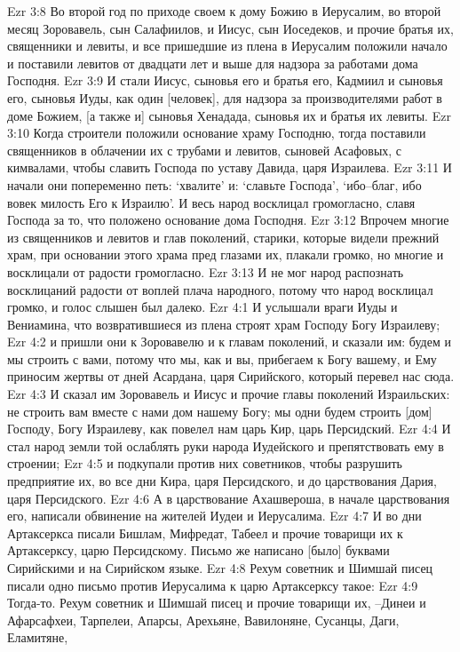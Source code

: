 Ezr 3:8  Во второй год по приходе своем к дому Божию в Иерусалим, во второй месяц Зоровавель, сын Салафиилов, и Иисус, сын Иоседеков, и прочие братья их, священники и левиты, и все пришедшие из плена в Иерусалим положили начало и поставили левитов от двадцати лет и выше для надзора за работами дома Господня.
Ezr 3:9  И стали Иисус, сыновья его и братья его, Кадмиил и сыновья его, сыновья Иуды, как один [человек], для надзора за производителями работ в доме Божием, [а также и] сыновья Хенадада, сыновья их и братья их левиты.
Ezr 3:10  Когда строители положили основание храму Господню, тогда поставили священников в облачении их с трубами и левитов, сыновей Асафовых, с кимвалами, чтобы славить Господа по уставу Давида, царя Израилева.
Ezr 3:11  И начали они попеременно петь: `хвалите' и: `славьте Господа', `ибо--благ, ибо вовек милость Его к Израилю'. И весь народ восклицал громогласно, славя Господа за то, что положено основание дома Господня.
Ezr 3:12  Впрочем многие из священников и левитов и глав поколений, старики, которые видели прежний храм, при основании этого храма пред глазами их, плакали громко, но многие и восклицали от радости громогласно.
Ezr 3:13  И не мог народ распознать восклицаний радости от воплей плача народного, потому что народ восклицал громко, и голос слышен был далеко.
Ezr 4:1  И услышали враги Иуды и Вениамина, что возвратившиеся из плена строят храм Господу Богу Израилеву;
Ezr 4:2  и пришли они к Зоровавелю и к главам поколений, и сказали им: будем и мы строить с вами, потому что мы, как и вы, прибегаем к Богу вашему, и Ему приносим жертвы от дней Асардана, царя Сирийского, который перевел нас сюда.
Ezr 4:3  И сказал им Зоровавель и Иисус и прочие главы поколений Израильских: не строить вам вместе с нами дом нашему Богу; мы одни будем строить [дом] Господу, Богу Израилеву, как повелел нам царь Кир, царь Персидский.
Ezr 4:4  И стал народ земли той ослаблять руки народа Иудейского и препятствовать ему в строении;
Ezr 4:5  и подкупали против них советников, чтобы разрушить предприятие их, во все дни Кира, царя Персидского, и до царствования Дария, царя Персидского.
Ezr 4:6  А в царствование Ахашвероша, в начале царствования его, написали обвинение на жителей Иудеи и Иерусалима.
Ezr 4:7  И во дни Артаксеркса писали Бишлам, Мифредат, Табеел и прочие товарищи их к Артаксерксу, царю Персидскому. Письмо же написано [было] буквами Сирийскими и на Сирийском языке.
Ezr 4:8  Рехум советник и Шимшай писец писали одно письмо против Иерусалима к царю Артаксерксу такое:
Ezr 4:9  Тогда-то. Рехум советник и Шимшай писец и прочие товарищи их, --Динеи и Афарсафхеи, Тарпелеи, Апарсы, Арехьяне, Вавилоняне, Сусанцы, Даги, Еламитяне,
